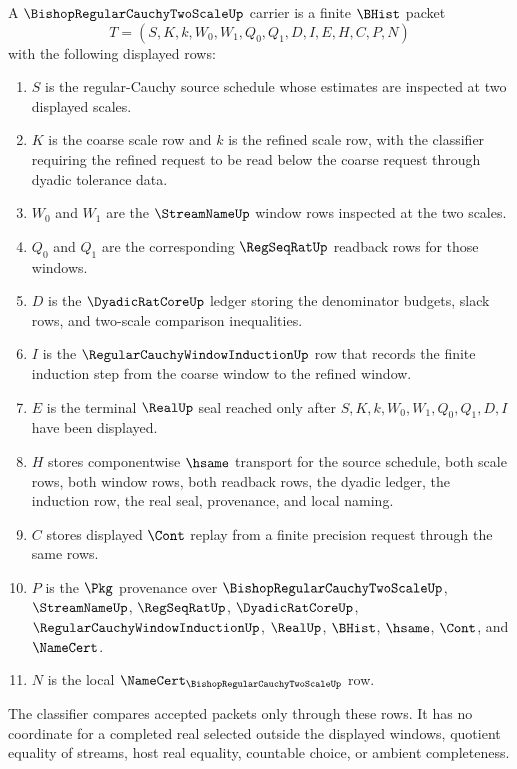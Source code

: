 \begin{definition}
\label{def:bishop-regular-cauchy-two-scale-carrier}
A $\BishopRegularCauchyTwoScaleUp$ carrier is a finite $\BHist$ packet
$$
T=(S,K,k,W_0,W_1,Q_0,Q_1,D,I,E,H,C,P,N)
$$
with the following displayed rows:
\begin{enumerate}
\item $S$ is the regular-Cauchy source schedule whose estimates are inspected at two displayed scales.
\item $K$ is the coarse scale row and $k$ is the refined scale row, with the classifier requiring the refined request to be read below the coarse request through dyadic tolerance data.
\item $W_0$ and $W_1$ are the $\StreamNameUp$ window rows inspected at the two scales.
\item $Q_0$ and $Q_1$ are the corresponding $\RegSeqRatUp$ readback rows for those windows.
\item $D$ is the $\DyadicRatCoreUp$ ledger storing the denominator budgets, slack rows, and two-scale comparison inequalities.
\item $I$ is the $\RegularCauchyWindowInductionUp$ row that records the finite induction step from the coarse window to the refined window.
\item $E$ is the terminal $\RealUp$ seal reached only after $S,K,k,W_0,W_1,Q_0,Q_1,D,I$ have been displayed.
\item $H$ stores componentwise $\hsame$ transport for the source schedule, both scale rows, both window rows, both readback rows, the dyadic ledger, the induction row, the real seal, provenance, and local naming.
\item $C$ stores displayed $\Cont$ replay from a finite precision request through the same rows.
\item $P$ is the $\Pkg$ provenance over $\BishopRegularCauchyTwoScaleUp$, $\StreamNameUp$, $\RegSeqRatUp$, $\DyadicRatCoreUp$, $\RegularCauchyWindowInductionUp$, $\RealUp$, $\BHist$, $\hsame$, $\Cont$, and $\NameCert$.
\item $N$ is the local $\NameCert_{\BishopRegularCauchyTwoScaleUp}$ row.
\end{enumerate}
The classifier compares accepted packets only through these rows. It has no coordinate for a completed real selected outside the displayed windows, quotient equality of streams, host real equality, countable choice, or ambient completeness.
\end{definition}

